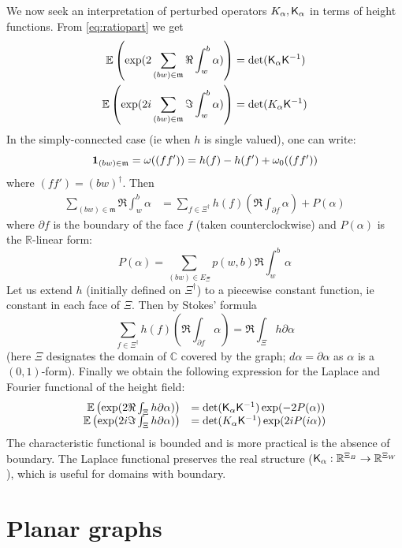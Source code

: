 \documentclass[10pt]{article}
\newcommand{\R}{\mathbb{R}}
\newcommand{\C}{\mathbb{C}}
\newcommand{\E}{\mathbb{E}}
\newcommand{\ind}{{\bf 1}}
\newcommand{\rK}{{\sf K}}
\newcommand{\dg}{\dagger}
\newcommand{\mfm}{{\mathfrak m}}
\begin{document}
We now seek an interpretation of perturbed operators $K_\alpha,\rK_\alpha$ in terms of height functions. 
From \eqref{eq:ratiopart} we get
\begin{align*}
\E\left(\exp(2\sum_{(bw)\in\mfm}\Re\int_w^b\alpha)\right)&=\det(\rK_\alpha\rK^{-1})\\
\E\left(\exp(2i\sum_{(bw)\in\mfm}\Im\int_w^b\alpha)\right)&=\det(K_\alpha \rK^{-1})
\end{align*}
In the simply-connected case (ie when $h$ is single valued), one can write:
$$\ind_{(bw)\in\mfm}=\omega((ff'))=h(f)-h(f')+\omega_0((ff'))$$
where $(ff')=(bw)^\dagger$. Then
\begin{align*}
\sum_{(bw)\in\mfm}\Re\int_w^b\alpha&=\sum_{f\in\Xi^\dagger}h(f)(\Re\int_{\partial f}\alpha)+P(\alpha)
\end{align*}
where $\partial f$ is the boundary of the face $f$ (taken counterclockwise) and $P(\alpha)$ is the $\R$-linear form:
$$P(\alpha)=\sum_{(bw)\in E_\Xi}p(w,b)\Re\int_w^b\alpha$$
Let us extend $h$ (initially defined on $\Xi^\dg$) to a piecewise constant function, ie constant in each face of $\Xi$. Then by Stokes' formula
$$\sum_{f\in\Xi^\dagger}h(f)(\Re\int_{\partial f}\alpha)=\Re\int_\Xi h\partial\alpha$$
(here $\Xi$ designates the domain of $\C$ covered by the graph; $d\alpha=\partial\alpha$ as $\alpha$ is a $(0,1)$-form). Finally we obtain the following expression for the Laplace and Fourier functional of the height field:
\begin{equation}\label{eq:FourLap}
\begin{array}{rl}
\E\left(\exp(2\Re\int_\Xi h\partial\alpha)\right)&=\det(\rK_\alpha\rK^{-1})\exp(-2P(\alpha))\\
\E\left(\exp(2i\Im\int_\Xi h\partial\alpha)\right)&=\det(K_\alpha \rK^{-1})\exp(2iP(i\alpha))
\end{array}
\end{equation}
The characteristic functional is bounded and is more practical is the absence of boundary. The Laplace functional preserves the real structure ($\rK_\alpha:\R^{\Xi_B}\rightarrow\R^{\Xi_W}$), which is useful for domains with boundary.



%
 
%
%
%
%
%
%
%
%
%
%
%
%
%
%
%
%
%

%
%
%




\section{Planar graphs}\label{sec:planar}
\end{document}
